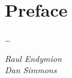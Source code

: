 \chapter*{Preface}                                  \label{ch:preface}

\ldots

\instructionspreface

\begin{epigraphs}
  \centering

    {\textit{Raul Endymion \\ Dan Simmons}}

\end{epigraphs}


\cleardoublepage

